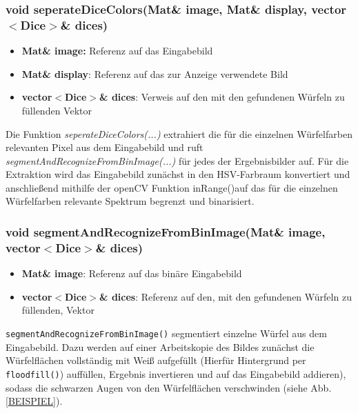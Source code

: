 \documentclass{../Vorlage/sebDenCls}
\begin{document}
\subsubsection{void seperateDiceColors(Mat\& image, Mat\& display, vector $<$Dice$>$\& dices)}
\begin{itemize}
	\item \textbf{Mat\& image:} Referenz auf das Eingabebild
	\item \textbf{Mat\& display}: Referenz auf das zur Anzeige verwendete Bild 
	\item \textbf{vector$<$Dice$>$\& dices}: Verweis auf den mit den gefundenen Würfeln zu füllenden Vektor
\end{itemize}
Die Funktion \emph{seperateDiceColors(...)} extrahiert die für die einzelnen Würfelfarben relevanten Pixel aus dem Eingabebild und ruft \emph{segmentAndRecognizeFromBinImage(...)} für jedes der Ergebnisbilder auf.
Für die Extraktion wird das Eingabebild zunächst in den HSV-Farbraum konvertiert und anschließend mithilfe der openCV Funktion \glqq inRange()\grqq  auf das für die einzelnen Würfelfarben relevante Spektrum begrenzt und binarisiert. 

\subsubsection{void segmentAndRecognizeFromBinImage(Mat\& image, vector$<$Dice$>$\& dices)}
\begin{itemize}
	\item \textbf{Mat\& image}: Referenz auf das binäre Eingabebild
	\item \textbf{vector$<$Dice$>$\& dices}: Referenz auf den, mit den gefundenen Würfeln zu füllenden, Vektor
\end{itemize}


\texttt{segmentAndRecognizeFromBinImage()} segmentiert einzelne Würfel aus dem Eingabebild. Dazu werden auf einer Arbeitskopie des Bildes zunächst die Würfelflächen vollständig mit Weiß aufgefüllt (Hierfür Hintergrund per \texttt{floodfill()}) auffüllen, Ergebnis invertieren und auf das Eingabebild addieren), sodass die schwarzen Augen von den Würfelflächen verschwinden (siehe Abb. \ref{BEISPIEL}). 
\end{document}
